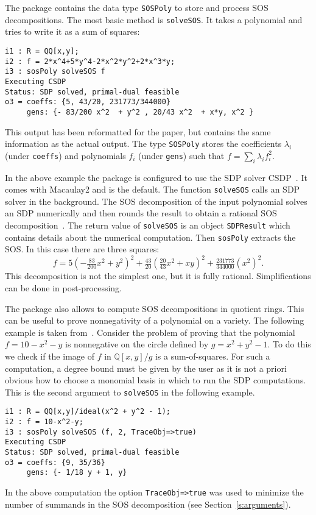 \documentclass[11pt]{amsart}
\theoremstyle{plain}%
\theoremstyle{definition}
\theoremstyle{remark}
\newcommand{\Mac}{Macaulay2\xspace}
\newcommand{\QQ}{\mathbb{Q}}
\begin{document}
The package contains the data type \verb|SOSPoly| to store and process SOS decompositions.
The most basic method is \verb|solveSOS|.
It takes a polynomial and tries to write it as a sum of squares:
{\small
\begin{verbatim}
i1 : R = QQ[x,y];
i2 : f = 2*x^4+5*y^4-2*x^2*y^2+2*x^3*y;
i3 : sosPoly solveSOS f
Executing CSDP
Status: SDP solved, primal-dual feasible
o3 = coeffs: {5, 43/20, 231773/344000}
     gens: {- 83/200 x^2  + y^2 , 20/43 x^2  + x*y, x^2 }
\end{verbatim}
}
\noindent
This output has been reformatted for the paper, but contains the same information as the actual output.
The type \verb|SOSPoly| stores the coefficients $\lambda_{i}$ (under \verb|coeffs|) and polynomials $f_{i}$ (under \verb|gens|) such that $f = \sum_{i}\lambda_{i}f_{i}^{2}$.

In the above example the package is configured to use the SDP solver CSDP~\cite{borchers1999csdp}.
It comes with \Mac and is the default.
The function \verb|solveSOS| calls an SDP solver in the background.
The SOS decomposition of the input polynomial solves an SDP numerically and then rounds the result to obtain a rational SOS decomposition~\cite{peyrl2008computing}.
The return value of \verb|solveSOS| is an object \verb|SDPResult| which contains details about the numerical computation.
Then \verb|sosPoly| extracts the SOS.
In this case there are three squares:
\[
  f = 5(-\tfrac{83}{200} x^{2}+y^{2})^{2} + \tfrac{43}{20}
  (\tfrac{20}{43}x^{2} + xy)^{2} + \tfrac{231773}{344000} (x^{2})^{2}.
\]
This decomposition is not the simplest one, but it is fully rational.
Simplifications can be done in post-processing.

The package also allows to compute SOS decompositions in quotient rings.
This can be useful to prove nonnegativity of a polynomial on a variety.
The following example is taken from~\cite{parrilo2005exploiting}.
Consider the problem of proving that the polynomial $f = 10{-}x^2{-}y$ is nonnegative on the circle defined by $g = x^2 {+} y^2 {-} 1$.
To do this we check if the image of $f$ in $\QQ[x,y]/g$ is a sum-of-squares.
For such a computation, a degree bound must be given by the user as it is not a priori obvious how to choose a monomial basis in which to run the SDP computations.
This is the second argument to \verb|solveSOS| in the following example.
{\small
\begin{verbatim}
i1 : R = QQ[x,y]/ideal(x^2 + y^2 - 1);
i2 : f = 10-x^2-y;
i3 : sosPoly solveSOS (f, 2, TraceObj=>true)
Executing CSDP
Status: SDP solved, primal-dual feasible
o3 = coeffs: {9, 35/36}
     gens: {- 1/18 y + 1, y}
\end{verbatim}
}
\noindent
In the above computation the option \verb|TraceObj=>true| was used to minimize the number of summands in the SOS decomposition (see Section~\ref{s:arguments}).
\end{document}
